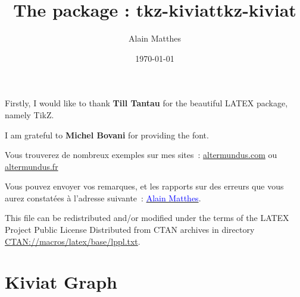 \documentclass[DIV         = 12,
               fontsize    = 10,
               headinclude = false,
               index       = totoc,
               footinclude = false,
               twoside,
               headings    = small
               ]{tkz-doc}
\title{The package : tkz-kiviat}
\author{Alain Matthes}
\gdef\nameofpack{tkz-kiviat}
\begin{document}
\parindent=0pt   
\title{\nameofpack}
\date{\today}

\clearpage
\thispagestyle{empty}
\maketitle

\clearpage
\tkzSetUpColors[background=fondpaille,text=Maroon]   
\pagecolor{fondpaille} 
\color{Maroon}   


\nameoffile{\nameofpack} 

\presentation

\vspace*{12pt}   

\tkzHand Firstly, I would like to thank \textbf{Till Tantau} for the  beautiful LATEX package, namely TikZ.

\vspace*{12pt}   
\tkzHand I am grateful to  \textbf{Michel Bovani} for providing the  font.




\vspace*{12pt}
\tkzHand Vous trouverez de nombreux exemples sur mes sites~: 
\href{http://altermundus.com/pages/download.html}{altermundus.com} ou 
\href{http://altermundus.fr/pages/download.html}{altermundus.fr}    

\vfill   
Vous pouvez envoyer vos remarques, et les rapports sur des erreurs que vous aurez constatées à l'adresse suivante~: \href{mailto:al.ma@mac.com}{\textcolor{blue}{Alain Matthes}}.
 
This file can be redistributed and/or modified under the terms of the LATEX 
Project Public License Distributed from CTAN archives in directory \url{CTAN://macros/latex/base/lppl.txt}.    



\clearpage
\tableofcontents
 
\clearpage\newpage 
   
\setlength{\parskip}{1ex plus 0.5ex minus 0.2ex}
     


\newpage\section{Kiviat Graph}
\end{document}
